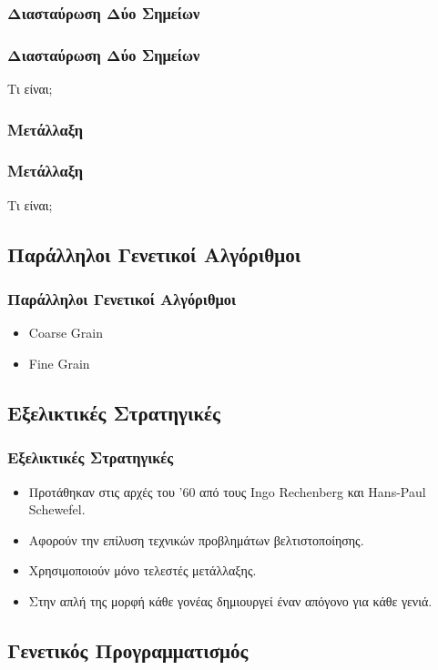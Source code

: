 \documentclass[xetex,mathserif,serif,14pt]{beamer}
\begin{document}
\subsubsection{Διασταύρωση Δύο Σημείων}

\begin{frame}
\frametitle{Διασταύρωση Δύο Σημείων}
Τι είναι;
\end{frame}

\subsubsection{Μετάλλαξη}

\begin{frame}
\frametitle{Μετάλλαξη}
Τι είναι;
\end{frame}

\subsection{Παράλληλοι Γενετικοί Αλγόριθμοι}

\begin{frame}
\frametitle{Παράλληλοι Γενετικοί Αλγόριθμοι}
\begin{itemize}
  \item Coarse Grain 
  \item Fine Grain
\end{itemize}
\end{frame}

\subsection{Εξελικτικές Στρατηγικές}

\begin{frame}
\frametitle{Εξελικτικές Στρατηγικές}
\begin{itemize}
  \item Προτάθηκαν στις αρχές του '60 από τους Ingo Rechenberg και Hans-Paul Schewefel.
  \item Αφορούν την επίλυση τεχνικών προβλημάτων βελτιστοποίησης.
  \item Χρησιμοποιούν μόνο τελεστές μετάλλαξης.
  \item Στην απλή της μορφή κάθε γονέας δημιουργεί έναν απόγονο για κάθε γενιά.
\end{itemize}
\end{frame}

\subsection{Γενετικός Προγραμματισμός}
\end{document}
